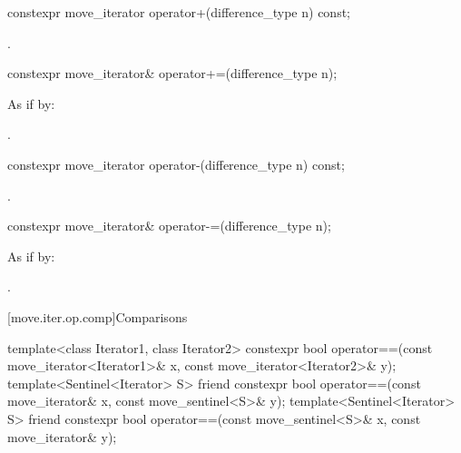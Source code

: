 %
\begin{itemdecl}
constexpr move_iterator operator+(difference_type n) const;
\end{itemdecl}

\begin{itemdescr}
\pnum
\returns {}.
\end{itemdescr}

%
\begin{itemdecl}
constexpr move_iterator& operator+=(difference_type n);
\end{itemdecl}

\begin{itemdescr}
\pnum
\effects As if by: 

\pnum
\returns {}.
\end{itemdescr}

%
\begin{itemdecl}
constexpr move_iterator operator-(difference_type n) const;
\end{itemdecl}

\begin{itemdescr}
\pnum
\returns {}.
\end{itemdescr}

%
\begin{itemdecl}
constexpr move_iterator& operator-=(difference_type n);
\end{itemdecl}

\begin{itemdescr}
\pnum
\effects As if by: 

\pnum
\returns {}.
\end{itemdescr}

[move.iter.op.comp]{Comparisons}

%
\begin{itemdecl}
template<class Iterator1, class Iterator2>
  constexpr bool operator==(const move_iterator<Iterator1>& x,
                            const move_iterator<Iterator2>& y);
template<Sentinel<Iterator> S>
  friend constexpr bool operator==(const move_iterator& x,
                                   const move_sentinel<S>& y);
template<Sentinel<Iterator> S>
  friend constexpr bool operator==(const move_sentinel<S>& x,
                                   const move_iterator& y);
\end{itemdecl}

